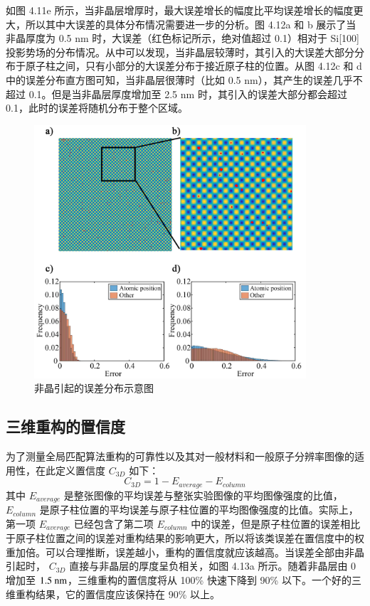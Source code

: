如图 4.11e 所示，当非晶层增厚时，最大误差增长的幅度比平均误差增长的幅度更大，所以其中大误差的具体分布情况需要进一步的分析。图 4.12a 和 b 展示了当非晶厚度为 0.5 nm 时，大误差（红色标记所示，绝对值超过 0.1）相对于 Si[100] 投影势场的分布情况。从中可以发现，当非晶层较薄时，其引入的大误差大部分分布于原子柱之间，只有小部分的大误差分布于接近原子柱的位置。从图 4.12c 和 d 中的误差分布直方图可知，当非晶层很薄时（比如 0.5 nm），其产生的误差几乎不超过 0.1。但是当非晶层厚度增加至 2.5 nm 时，其引入的误差大部分都会超过 0.1，此时的误差将随机分布于整个区域。

\begin{figure}[htbp]
	\vspace{\baselineskip}
	\centering
	\includegraphics[width=0.9\textwidth]{../2.11/211}
	\caption{非晶引起的误差分布示意图}\label{fig:211}
	\song{}
\end{figure}

\subsection{三维重构的置信度}
为了测量全局匹配算法重构的可靠性以及其对一般材料和一般原子分辨率图像的适用性，在此定义置信度 $C_{3D}$ 如下：
\begin{equation}
C_{3D}=1-E_{average}-E_{column}
\end{equation}
其中 $E_{average}$ 是整张图像的平均误差与整张实验图像的平均图像强度的比值，$E_{column}$ 是原子柱位置的平均误差与原子柱位置的平均图像强度的比值。实际上，第一项 $E_{average}$ 已经包含了第二项 $E_{column}$ 中的误差，但是原子柱位置的误差相比于原子柱位置之间的误差对重构结果的影响更大，所以将该类误差在置信度中的权重加倍。可以合理推断，误差越小，重构的置信度就应该越高。当误差全部由非晶引起时， $C_{3D}$ 直接与非晶层的厚度呈负相关，如图 4.13a 所示。随着非晶层由 0 增加至 $1.5 \textnormal{ nm}$，三维重构的置信度将从 100\% 快速下降到 90\% 以下。一个好的三维重构结果，它的置信度应该保持在 90\% 以上。



